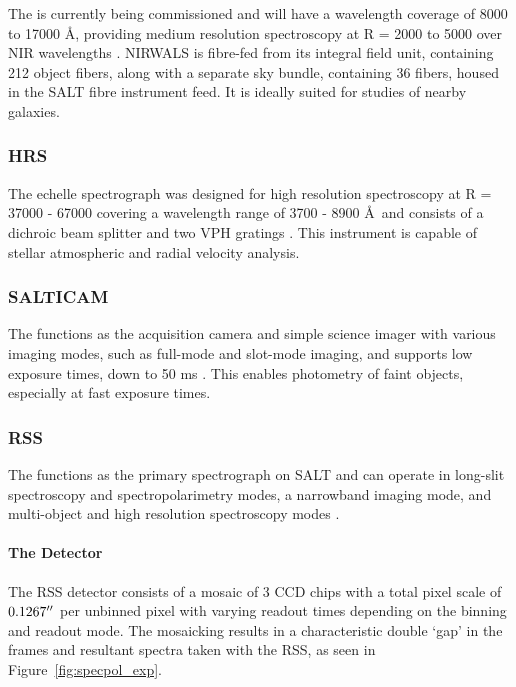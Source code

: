 The  is currently being commissioned and will have a wavelength coverage of 8000 to 17000 \AA, providing medium resolution spectroscopy at R = 2000 to 5000 over \gls{NIR} wavelengths \citep{NIRWALS, SALT_NIRWALS}. \gls{NIRWALS} is fibre-fed from its integral field unit, containing 212 object fibers, along with a separate sky bundle, containing 36 fibers, housed in the \gls{SALT} fibre instrument feed. It is ideally suited for studies of nearby galaxies.

\subsubsection{\gls{HRS}}

The  echelle spectrograph was designed for high resolution spectroscopy at R = 37000 - 67000 covering a wavelength range of 3700 - 8900 \AA\ and consists of a dichroic beam splitter and two \gls{VPH} gratings \citep{SALT_hires}. This instrument is capable of stellar atmospheric and radial velocity analysis.

\subsubsection{\gls{SALTICAM}}

The  functions as the acquisition camera and simple science imager with various imaging modes, such as full-mode and slot-mode imaging, and supports low exposure times, down to 50 ms \citep{SALTICAM}. This enables photometry of faint objects, especially at fast exposure times.

\subsubsection{\gls{RSS}} \label{subsubsec:RSS}

The  functions as the primary spectrograph on \gls{SALT} and can operate in long-slit spectroscopy and spectropolarimetry modes, a narrowband imaging mode, and multi-object and high resolution spectroscopy modes \citep[for an in-depth discussion on operational modes see][or the \href{https://pysalt.salt.ac.za/proposal_calls/current/ProposalCall.html}{latest call for proposals}]{SALT_operational_modes}.

\paragraph{The Detector}
The \gls{RSS} detector consists of a mosaic of 3 \gls{CCD} chips with a total pixel scale of $0.1267\hbox{$^{\prime\prime}$}$ per unbinned pixel with varying readout times depending on the binning and readout mode. The mosaicking results in a characteristic double `gap' in the frames and resultant spectra taken with the \gls{RSS}, as seen in Figure~\ref{fig:specpol_exp}.

